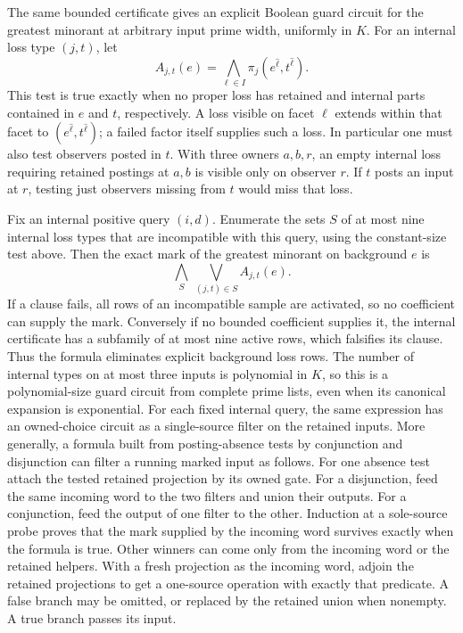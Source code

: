 The same bounded certificate gives an explicit Boolean
guard circuit for the greatest minorant at arbitrary
input prime width, uniformly in $K$. For an internal
loss type $(j,t)$, let
\[
 A_{j,t}(e)=\bigwedge_{\ell\in I}
                    \pi_j(e^{\widehat\ell},t^{\widehat\ell}).
\]
This test is true exactly when no proper loss
has retained and internal parts contained in
$e$ and $t$, respectively. A loss visible on
facet $\ell$ extends within that facet to
$(e^{\widehat\ell},t^{\widehat\ell})$; a failed
factor itself supplies such a loss.
In particular one must also test observers
posted in $t$. With three owners $a,b,r$,
an empty internal loss requiring retained
postings at $a,b$ is visible only on
observer $r$. If $t$ posts an input at $r$,
testing just observers missing from $t$
would miss that loss.

Fix an internal positive query $(i,d)$. Enumerate
the sets $S$ of at most nine internal loss types
that are incompatible with this query, using the
constant-size test above. Then the exact mark of
the greatest minorant on background $e$ is
\[
                 \bigwedge_S\ \bigvee_{(j,t)\in S}
                                    A_{j,t}(e).
\]
If a clause fails, all rows of an incompatible
sample are activated, so no coefficient can
supply the mark. Conversely if no bounded
coefficient supplies it, the internal certificate
has a subfamily of at most nine active rows,
which falsifies its clause. Thus the formula
eliminates explicit background loss rows.
The number of internal types on at most three
inputs is polynomial in $K$, so this is a
polynomial-size guard circuit from complete
prime lists, even when its canonical expansion
is exponential. For each fixed internal query, the same expression
has an owned-choice circuit as a single-source
filter on the retained inputs. More generally,
a formula built from posting-absence tests by
conjunction and disjunction can filter a running
marked input as follows. For one absence test
attach the tested retained projection by its
owned gate. For a disjunction, feed the same
incoming word to the two filters and union their
outputs. For a conjunction, feed the output of
one filter to the other. Induction at a
sole-source probe proves that the mark supplied
by the incoming word survives exactly when the
formula is true. Other winners can come only
from the incoming word or the retained helpers.
With a fresh projection as the incoming word,
adjoin the retained projections to get a
one-source operation with exactly that predicate.
A false branch may be omitted, or replaced by
the retained union when nonempty. A true branch
passes its input.

